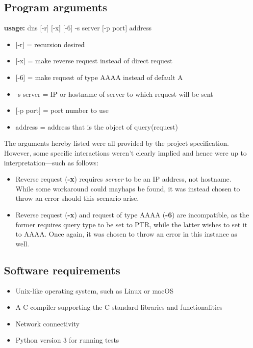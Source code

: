 \documentclass[a4paper, 11pt]{article}
\begin{document}
	\subsection{Program arguments}
	\noindent \textbf{usage:}  dns [-r] [-x] [-6] -s server [-p port] address
	\begin{itemize}[label={}]
		\item {[-r]} = recursion desired
		\item {[-x]} = make reverse request instead of direct request
		\item {[-6]} = make request of type AAAA instead of default A
		\item -s server = IP or hostname of server to which request will be sent
		\item {[-p port]} = port number to use
		\item address = address that is the object of query(request)
	\end{itemize}
	\noindent The arguments hereby listed were all provided by the project specification. However, some specific 
	interactions weren't clearly implied and hence were up to interpretation---such as follows: 
	\begin{itemize}
		\item Reverse request (\textbf{-x}) requires \textit{server} to be an IP address, not hostname. While 
			some workaround could mayhaps be found, it was instead chosen to throw an error 
			should this scenario arise.
		\item Reverse request (\textbf{-x}) and request of type AAAA (\textbf{-6}) are incompatible, 
			as the former requires query type to be set to PTR, while the latter wishes to set it to 
			AAAA. Once again, it was chosen to throw an error in this instance as well.
	\end{itemize}
	
	\subsection{Software requirements}
		\begin{itemize}
			\item Unix-like operating system, such as Linux or macOS 
			\item A C compiler supporting the C standard libraries and functionalities
			\item Network connectivity
			\item Python version 3 for running tests
		\end{itemize}
\end{document}
